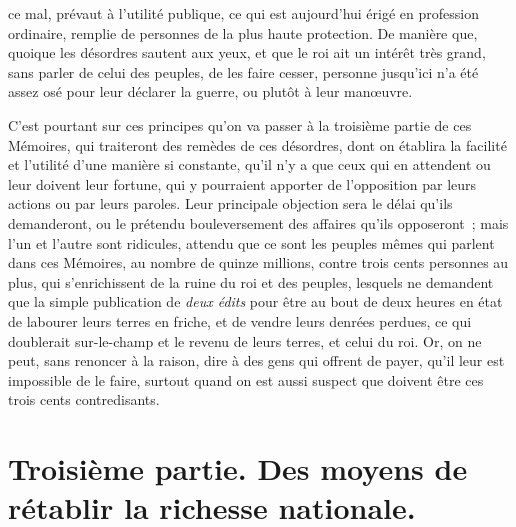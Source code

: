 \documentclass[french,twoside]{book} %
\begin{document}
ce mal, prévaut à l’utilité publique, ce qui est aujourd’hui érigé en profession ordinaire, remplie de personnes de la plus haute protection. De manière que, quoique les désordres sautent aux yeux, et que le roi ait un intérêt très grand, sans parler de celui des peuples, de les faire cesser, personne jusqu’ici n’a été assez osé pour leur déclarer la guerre, ou plutôt à leur manœuvre.\par
C’est pourtant sur ces principes qu’on va passer à la troisième partie de ces Mémoires, qui traiteront des remèdes de ces désordres, dont on établira la facilité et l’utilité d’une manière si constante, qu’il n’y a que ceux qui en attendent ou leur doivent leur fortune, qui y pourraient apporter de l’opposition par leurs actions ou par leurs paroles. Leur principale objection sera le délai qu’ils demanderont, ou le prétendu bouleversement des affaires qu’ils opposeront ; mais l’un et l’autre sont ridicules, attendu que ce sont les peuples mêmes qui parlent dans ces Mémoires, au nombre de quinze millions, contre trois cents personnes au plus, qui s’enrichissent de la ruine du roi et des peuples, lesquels ne demandent que la simple publication de {\itshape deux édits} pour être au bout de deux heures en état de labourer leurs terres en friche, et de vendre leurs denrées perdues, ce qui doublerait sur-le-champ et le revenu de leurs terres, et celui du roi. Or, on ne peut, sans renoncer à la raison, dire à des gens qui offrent de payer, qu’il leur est impossible de le faire, surtout quand on est aussi suspect que doivent être ces trois cents contredisants.
\section[{Troisième partie. Des moyens de rétablir la richesse nationale.}]{Troisième partie. Des moyens de rétablir la richesse nationale.}
\end{document}
